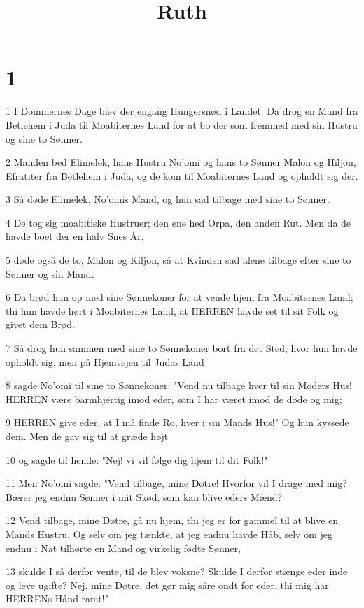 

\title{Ruth}


\chapter{1}

\par 1 I Dommernes Dage blev der engang Hungersnød i Landet. Da drog en Mand fra Betlehem i Juda til Moabiternes Land for at bo der som fremmed med sin Hustru og sine to Sønner.
\par 2 Manden bed Elimelek, hans Hustru No'omi og hans to Sønner Malon og Hiljon, Efratiter fra Betlehem i Juda, og de kom til Moabiternes Land og opholdt sig der.
\par 3 Så døde Elimelek, No'omis Mand, og hun sad tilbage med sine to Sønner.
\par 4 De tog sig moabitiske Hustruer; den ene hed Orpa, den anden Rut. Men da de havde boet der en halv Snes År,
\par 5 døde også de to, Malon og Kiljon, så at Kvinden sad alene tilbage efter sine to Sønner og sin Mand.
\par 6 Da brød hun op med sine Sønnekoner for at vende hjem fra Moabiternes Land; thi hun havde hørt i Moabiternes Land, at HERREN havde set til sit Folk og givet dem Brød.
\par 7 Så drog hun sammen med sine to Sønnekoner bort fra det Sted, hvor hun havde opholdt sig, men på Hjemvejen til Judas Land
\par 8 sagde No'omi til sine to Sønnekoner: "Vend nu tilbage hver til sin Moders Hus! HERREN være barmhjertig imod eder, som I har været imod de døde og mig;
\par 9 HERREN give eder, at I må finde Ro, hver i sin Mands Hus!" Og hun kyssede dem. Men de gav sig til at græde højt
\par 10 og sagde til hende: "Nej! vi vil følge dig hjem til dit Folk!"
\par 11 Men No'omi sagde: "Vend tilbage, mine Døtre! Hvorfor vil I drage med mig? Bærer jeg endnu Sønner i mit Skød, som kan blive eders Mænd?
\par 12 Vend tilbage, mine Døtre, gå nu hjem, thi jeg er for gammel til at blive en Mands Hustru. Og selv om jeg tænkte, at jeg endnu havde Håb, selv om jeg endnu i Nat tilhørte en Mand og virkelig fødte Sønner,
\par 13 skulde I så derfor vente, til de blev voksne? Skulde I derfor stænge eder inde og leve ugifte? Nej, mine Døtre, det gør mig såre ondt for eder, thi mig har HERRENs Hånd ramt!"
